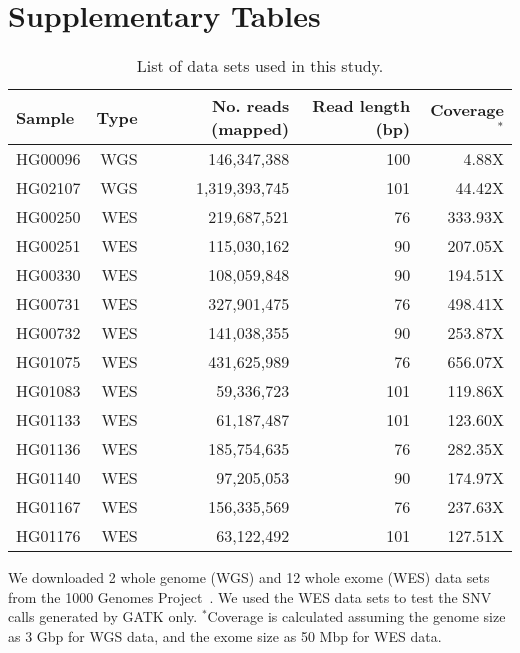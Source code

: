 


\section*{Supplementary Tables}
\setcounter{table}{0}
\setcounter{page}{1}

\renewcommand{\tablename}{Supplementary Table}
\renewcommand{\thetable}{S\arabic{table}}%

\onecolumn

\begin{table*}[htb]
\caption{List of data sets used in this study.}
\begin{center}
\begin{tabular}{|l|r|r|r|r|}
\hline
{\bf Sample} & {\bf Type} & {\bf No. reads (mapped)} & {\bf Read length (bp)} & {\bf Coverage$^*$}\\
\hline
HG00096 & WGS & 146,347,388 & 100 & 4.88X\\
HG02107 & WGS & 1,319,393,745 & 101 & 44.42X\\
\hline
HG00250 & WES & 219,687,521 & 76 & 333.93X \\ 
HG00251 & WES & 115,030,162 & 90 & 207.05X \\ 
HG00330 & WES & 108,059,848 & 90 & 194.51X \\ 
HG00731 & WES & 327,901,475 & 76 & 498.41X \\ 
HG00732 & WES & 141,038,355 & 90 & 253.87X \\ 
HG01075 & WES & 431,625,989 & 76 & 656.07X \\ 
HG01083 & WES & 59,336,723 & 101 & 119.86X \\ 
HG01133 & WES & 61,187,487 & 101 & 123.60X \\ 
HG01136 & WES & 185,754,635 & 76 & 282.35X \\ 
HG01140 & WES & 97,205,053 & 90 & 174.97X \\ 
HG01167 & WES & 156,335,569 & 76 & 237.63X \\ 
HG01176 & WES & 63,122,492 & 101 & 127.51X \\ 
\hline
\end{tabular}
\end{center}
{\footnotesize We downloaded 2 whole genome (WGS) and 12 whole exome (WES) data sets from the 1000 Genomes Project~\citep{1000GP2012}. We
  used the WES data sets to test the SNV calls generated by GATK only.
  $^*$Coverage is calculated assuming the genome size as 3 Gbp for WGS data, and the exome size as 50 Mbp for WES data.}
\label{supptab:data}
\end{table*}

